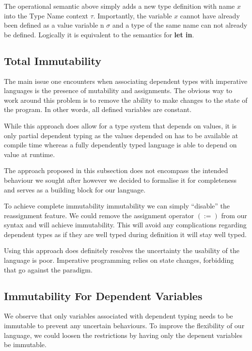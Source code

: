 \documentclass[a4paper,12pt]{report}
\begin{document}
\par
The operational semantic above simply adds a new type definition with name $x$ 
into the Type Name context $\tau$. Importantly, the variable $x$ cannot have 
already been defined as a value variable n $\sigma$ and a type of the same name 
can not already be defined. Logically it is equivalent to the semantics for 
\textbf{let in}.


\subsection{Total Immutability}
The main issue one encounters when associating dependent types with imperative 
languages is the presence of mutability and assignments. The obvious way to 
work around this problem is to remove the ability to make changes to the state 
of the program. In other words, all defined variables are constant. 

\par
While this approach does allow for a type system that depends on values, it is 
only partial dependent typing as the values depended on has to be available at 
compile time whereas a fully dependently typed language is able to depend on 
value at runtime.

\par
The approach proposed in this subsection does not encompass the intended behaviour we 
sought after however we decided to formalise it for completeness and serves as 
a building block for our language. 

\par
To achieve complete immutability immutability we can simply ``disable'' the 
reassignment feature. We could remove the assignment operator $(:=)$ from our 
syntax and will achieve immutability. This will avoid any complications 
regarding dependent types as 
if they are well typed during definition it will stay well typed. 

\par
Using this approach does definitely resolves the uncertainty the usability of 
the language is poor. Imperative programming relies on state changes, forbidding 
that go against the paradigm. 

\subsection{Immutability For Dependent Variables}
We observe that only variables associated with dependent typing needs to be 
immutable to prevent any uncertain behaviours. To improve the flexibility of our 
language, we could loosen the restrictions by having only the depenent variables 
be immutable. 
\end{document}
